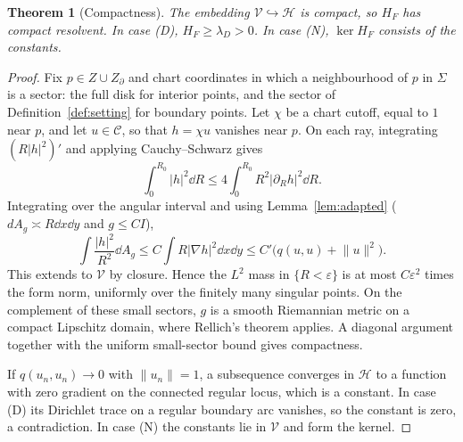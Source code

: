 \documentclass[11pt]{article}
\newtheorem{theorem}{Theorem}[section]
\theoremstyle{definition}\newtheorem{definition}[theorem]{Definition}
\theoremstyle{remark}\newtheorem{remark}[theorem]{Remark}
\newcommand{\norm}[1]{\lVert#1\rVert}
\newcommand{\cH}{\mathcal H}\newcommand{\cV}{\mathcal V}\newcommand{\inte}{\operatorname{int}}
\begin{document}
\begin{theorem}[Compactness]\label{thm:compact}
The embedding $\cV\hookrightarrow\cH$ is compact, so $H_F$ has compact
resolvent. In case (D), $H_F\geq\lambda_D>0$. In case (N),
$\ker H_F$ consists of the constants.
\end{theorem}
\begin{proof}
Fix $p\in Z\cup Z_\partial$ and chart coordinates in which a neighbourhood of
$p$ in $\Sigma$ is a sector: the full disk for interior points, and the sector
of Definition~\ref{def:setting} for boundary points. Let $\chi$ be a
chart cutoff, equal to $1$ near $p$, and let $u\in\mathcal C$, so that $h=\chi u$
vanishes near $p$. On each ray, integrating $(R|h|^2)'$ and applying
Cauchy--Schwarz gives
\[
 \int_0^{R_0}|h|^2\dd R\leq4\int_0^{R_0}R^2|\partial_Rh|^2\dd R .
\]
Integrating over the angular interval and using Lemma~\ref{lem:adapted}
($dA_g\asymp R\dd x\dd y$ and $g\leq CI$),
\[
 \int\frac{|h|^2}{R^2}\dd A_g\leq C\int R|\nabla h|^2\dd x\dd y\leq C'\bigl(q(u,u)+\norm u^2\bigr).
\]
This extends to $\cV$ by closure. Hence the $L^2$ mass in $\{R<\varepsilon\}$ is
at most $C\varepsilon^2$ times the form norm, uniformly over the finitely many
singular points. On the complement of these small sectors, $g$ is a smooth
Riemannian metric on a compact Lipschitz domain, where Rellich's theorem
applies. A diagonal argument together with the uniform small-sector bound gives
compactness.

If $q(u_n,u_n)\to0$ with $\norm{u_n}=1$, a subsequence converges in $\cH$ to a
function with zero gradient on the connected regular locus, which is a
constant. In case (D) its Dirichlet trace on a regular boundary arc vanishes,
so the constant is zero, a contradiction. In case (N) the constants lie in
$\cV$ and form the kernel.
\end{proof}
\end{document}

